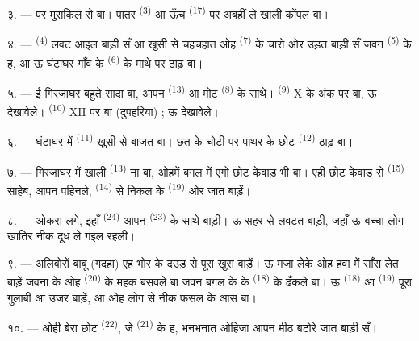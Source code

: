 ३. ---  पर मुसकिल से  बा। पातर
 \textsuperscript{(3)} आ ऊँच  \textsuperscript{(17)}
पर अबहीं ले खाली कोंपल बा।

४. ---  \textsuperscript{(4)} लवट आइल बाड़ी सँ आ खुसी से
चहचहात ओह  \textsuperscript{(7)} के चारो ओर उड़त बाड़ी सँ
जवन  \textsuperscript{(5)} के ह, आ ऊ घंटाघर गाँव के
 \textsuperscript{(6)} के माथे पर ठाढ़ बा।

\VUsaut{3.4mm}
\VUsaut{3.0mm}

५. --- ई गिरजाघर बहुते सादा बा, आपन 
\textsuperscript{(13)} आ मोट  \textsuperscript{(8)} के साथे।
 \textsuperscript{(9)} X के अंक पर बा, ऊ 
देखावेले।  \textsuperscript{(10)} XII पर बा (दुपहरिया) ; ऊ
 देखावेले।

६. --- घंटाघर में  \textsuperscript{(11)} खुसी से बाजत बा।
छत के चोटी पर पाथर के छोट  \textsuperscript{(12)} ठाढ़ बा।

७. --- गिरजाघर में खाली  \textsuperscript{(13)} ना
बा, ओहमें बगल में एगो छोट केवाड़ भी बा। एही छोट केवाड़ से
 \textsuperscript{(15)} साहेब, आपन  पहिनले,
 \textsuperscript{(14)} से निकल के  \textsuperscript{(19)} ओर जात बाड़ें।

८. --- ओकरा लगे, इहाँ  \textsuperscript{(24)} आपन
 \textsuperscript{(23)} के साथे बाड़ी। ऊ सहर से लवटत बाड़ी,
जहाँ ऊ बच्चा लोग खातिर नीक दूध ले गइल रहली।

\VUsaut{4.0mm}
\VUsaut{3.4mm}

९. --- अलिबोरों बाबू (गदहा) एह भोर के दउड़ से पूरा खुस बाड़ें। ऊ मजा
लेके ओह हवा में साँस लेत बाड़ें जवना के ओह 
\textsuperscript{(20)} के महक बसवले बा जवन बगल के  के
 \textsuperscript{(18)} के ढँकले बा। ऊ 
\textsuperscript{(18)} आ  \textsuperscript{(19)} पूरा
गुलाबी आ उजर बाड़ें, आ ओह लोग से नीक फसल के आस बा।

१०. --- ओही बेरा छोट  \textsuperscript{(22)}, जे
 \textsuperscript{(21)} के ह, भनभनात ओहिजा आपन मीठ
 बटोरे जात बाड़ी सँ।

